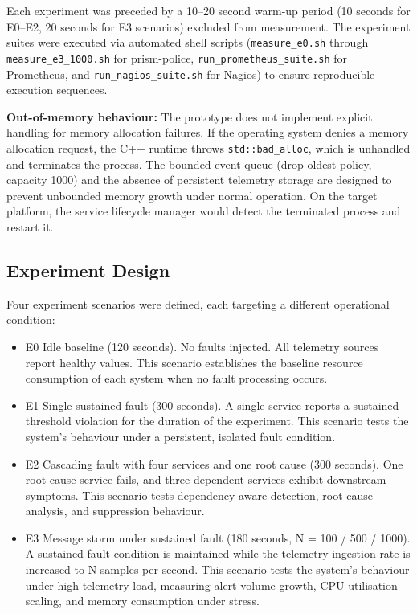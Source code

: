 Each experiment was preceded by a 10--20 second warm-up period (10 seconds for E0--E2, 20 seconds for E3 scenarios) excluded from measurement. The experiment suites were executed via automated shell scripts (\texttt{measure\_e0.sh} through \texttt{measure\_e3\_1000.sh} for prism-police, \texttt{run\_prometheus\_suite.sh} for Prometheus, and \texttt{run\_nagios\_suite.sh} for Nagios) to ensure reproducible execution sequences.

\textbf{Out-of-memory behaviour:} The prototype does not implement explicit handling for memory allocation failures. If the operating system denies a memory allocation request, the C++ runtime throws \texttt{std::bad\_alloc}, which is unhandled and terminates the process. The bounded event queue (drop-oldest policy, capacity 1000) and the absence of persistent telemetry storage are designed to prevent unbounded memory growth under normal operation. On the target platform, the service lifecycle manager would detect the terminated process and restart it.

\subsection{Experiment Design}

Four experiment scenarios were defined, each targeting a different operational condition:

\begin{itemize}
\item E0 Idle baseline (120 seconds). No faults injected. All telemetry sources report healthy values. This scenario establishes the baseline resource consumption of each system when no fault processing occurs.

\item E1 Single sustained fault (300 seconds). A single service reports a sustained threshold violation for the duration of the experiment. This scenario tests the system's behaviour under a persistent, isolated fault condition.

\item E2 Cascading fault with four services and one root cause (300 seconds). One root-cause service fails, and three dependent services exhibit downstream symptoms. This scenario tests dependency-aware detection, root-cause analysis, and suppression behaviour.

\item E3 Message storm under sustained fault (180 seconds, N = 100 / 500 / 1000). A sustained fault condition is maintained while the telemetry ingestion rate is increased to N samples per second. This scenario tests the system's behaviour under high telemetry load, measuring alert volume growth, CPU utilisation scaling, and memory consumption under stress.
\end{itemize}

